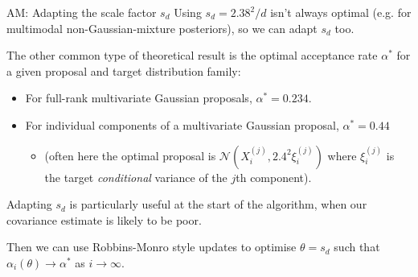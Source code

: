 \documentclass[aspectratio=169]{beamer}
\begin{document}
\begin{frame}{AM: Adapting the scale factor $s_d$}
    Using $s_d = 2.38^2/d$ isn't always optimal (e.g. for multimodal non-Gaussian-mixture posteriors), so we can adapt $s_d$ too.
    
    \vspace{1em}
    \pause 
    The other common type of theoretical result is the optimal acceptance rate $\alpha^*$ for a given proposal and target distribution family:
    \pause
    \begin{itemize}
        \item For full-rank multivariate Gaussian proposals, $\alpha^* = 0.234$.
        \pause

        \item For individual components of a multivariate Gaussian proposal, $\alpha^* = 0.44$ 
        \pause 

        \begin{itemize}
            \item (often here the optimal proposal is $\mathcal{N}(X_i^{(j)}, 2.4^2 \xi_i^{(j)})$ where $\xi_i^{(j)}$ is the target \textit{conditional} variance of the $j$th component).
        \end{itemize}
    \end{itemize}

    \pause 
    \vspace{1em}
    Adapting $s_d$ is particularly useful at the start of the algorithm, when our covariance estimate is likely to be poor.

    \pause
    \vspace{1em}
    Then we can use Robbins-Monro style updates to optimise $\theta = s_d$ such that $\alpha_i(\theta) \to \alpha^*$ as $i \to \infty$.

\end{frame}
\end{document}

